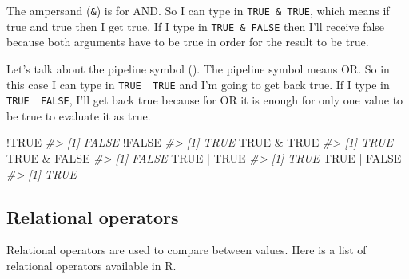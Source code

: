 \documentclass[
]{book}
\newenvironment{Shaded}{\begin{snugshade}}{\end{snugshade}}
\newcommand{\CommentTok}[1]{\textcolor[rgb]{0.56,0.35,0.01}{\textit{#1}}}
\newcommand{\ConstantTok}[1]{\textcolor[rgb]{0.00,0.00,0.00}{#1}}
\newcommand{\SpecialCharTok}[1]{\textcolor[rgb]{0.00,0.00,0.00}{#1}}
\begin{document}
The ampersand (\texttt{\&}) is for AND. So I can type in \texttt{TRUE\ \&\ TRUE}, which means if true and true then I get true. If I type in \texttt{TRUE\ \&\ FALSE} then I'll receive false because both arguments have to be true in order for the result to be true.

Let's talk about the pipeline symbol (\texttt{\textbar{}}). The pipeline symbol means OR. So in this case I can type in \texttt{TRUE\ \textbar{}\ TRUE} and I'm going to get back true. If I type in \texttt{TRUE\ \textbar{}\ FALSE}, I'll get back true because for OR it is enough for only one value to be true to evaluate it as true.

\begin{Shaded}
\begin{Highlighting}[]
\SpecialCharTok{!}\ConstantTok{TRUE}
\CommentTok{\#\textgreater{} [1] FALSE}
\SpecialCharTok{!}\ConstantTok{FALSE}
\CommentTok{\#\textgreater{} [1] TRUE}
\ConstantTok{TRUE} \SpecialCharTok{\&} \ConstantTok{TRUE}
\CommentTok{\#\textgreater{} [1] TRUE}
\ConstantTok{TRUE} \SpecialCharTok{\&} \ConstantTok{FALSE}
\CommentTok{\#\textgreater{} [1] FALSE}
\ConstantTok{TRUE} \SpecialCharTok{|} \ConstantTok{TRUE}
\CommentTok{\#\textgreater{} [1] TRUE}
\ConstantTok{TRUE} \SpecialCharTok{|} \ConstantTok{FALSE}
\CommentTok{\#\textgreater{} [1] TRUE}
\end{Highlighting}
\end{Shaded}

\hypertarget{relational-operators}{%
\subsection{Relational operators}\label{relational-operators}}

Relational operators are used to compare between values. Here is a list of relational operators available in R.
\end{document}

